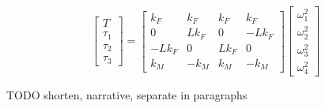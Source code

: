 \[
\begin{bmatrix}
    T \\
    \tau_1 \\
    \tau_2 \\
    \tau_3
\end{bmatrix} = 
\begin{bmatrix}
    k_F & k_F & k_F & k_F \\
    0 & Lk_F & 0 & -Lk_F \\
    -Lk_F & 0 & Lk_F & 0 \\
    k_M & -k_M & k_M & -k_M
\end{bmatrix}
\begin{bmatrix}
    \omega_1^2 \\
    \omega_2^2 \\
    \omega_3^2 \\
    \omega_4^2
\end{bmatrix}
\]

TODO shorten, narrative, separate in paragraphs







